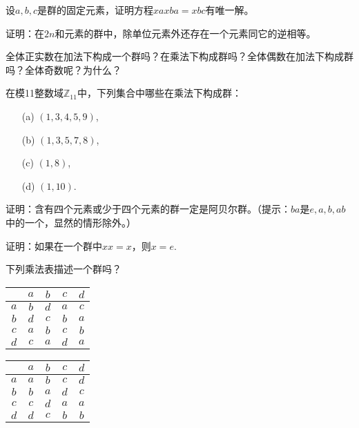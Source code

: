 \begin{problemset}
\item 设$a,b,c$是群的固定元素，证明方程$xaxba=xbc$有唯一解。

\item 证明：在$2n$和元素的群中，除单位元素外还存在一个元素同它的逆相等。

\item 全体正实数在加法下构成一个群吗？在乘法下构成群吗？全体偶数在加法下构成群吗？全体奇数呢？为什么？

\item 在模11整数域$\mathbb{Z}_{11}$中，下列集合中哪些在乘法下构成群：
\begin{enumerate}
\item[(a)] $(1,3,4,5,9)$,
\item[(b)] $(1,3,5,7,8)$,
\item[(c)] $(1, 8)$,
\item[(d)] $(1, 10)$.
\end{enumerate}

\item 证明：含有四个元素或少于四个元素的群一定是阿贝尔群。（提示：$ba$是$e, a, b, ab$中的一个，显然的情形除外。）

\item\label{exer001060406} 证明：如果在一个群中$xx=x$，则$x=e$.

\item 下列乘法表描述一个群吗？
\begin{table}[htbp]
\begin{minipage}{0.45\textwidth}
\centering
\begin{tabular}{|c|c|c|c|c|}
\hline
&$a$ & $b$ & $c$ & $d$ \\ \hline
$a$ & $b$ & $d$ & $a$ & $c$ \\ \hline
$b$ & $d$ & $c$ & $b$ & $a$ \\ \hline
$c$ & $a$ & $b$ & $c$ & $b$ \\ \hline
$d$ & $c$ & $a$ & $d$ & $a$ \\ \hline
\end{tabular}
\end{minipage}
\begin{minipage}{0.45\textwidth}
\centering
\begin{tabular}{|c|c|c|c|c|}
\hline
&$a$ & $b$ & $c$ & $d$ \\ \hline
$a$ & $a$ & $b$ & $c$ & $d$ \\ \hline
$b$ & $b$ & $a$ & $d$ & $c$ \\ \hline
$c$ & $c$ & $d$ & $a$ & $a$ \\ \hline
$d$ & $d$ & $c$ & $b$ & $b$ \\ \hline
\end{tabular}
\end{minipage}
\end{table}


\end{problemset}
